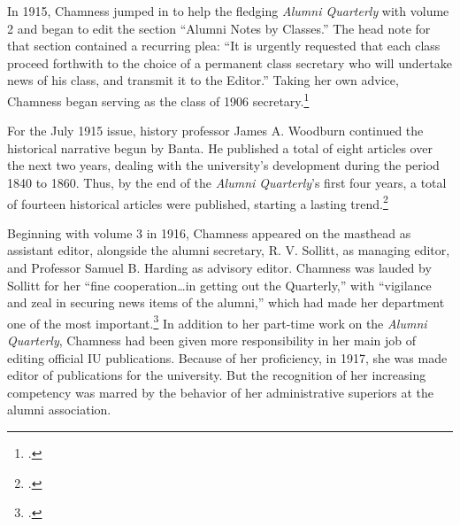 \documentclass[
  american,
  letterpaper,
]{scrreprt}
\begin{document}
In 1915, Chamness jumped in to help the fledging \emph{Alumni Quarterly}
with volume 2 and began to edit the section ``Alumni Notes by Classes.''
The head note for that section contained a recurring plea: ``It is
urgently requested that each class proceed forthwith to the choice of a
permanent class secretary who will undertake news of his class, and
transmit it to the Editor.'' Taking her own advice, Chamness began
serving as the class of 1906 secretary.\footnote{.}

For the July 1915 issue, history professor James A. Woodburn continued
the historical narrative begun by Banta. He published a total of eight
articles over the next two years, dealing with the university's
development during the period 1840 to 1860. Thus, by the end of the
\emph{Alumni Quarterly}'s first four years, a total of fourteen
historical articles were published, starting a lasting trend.\footnote{.}

Beginning with volume 3 in 1916, Chamness appeared on the masthead as
assistant editor, alongside the alumni secretary, R. V. Sollitt, as
managing editor, and Professor Samuel B. Harding as advisory editor.
Chamness was lauded by Sollitt for her ``fine cooperation\ldots in
getting out the Quarterly,'' with ``vigilance and zeal in securing news
items of the alumni,'' which had made her department one of the most
important.\footnote{.} In addition to her part-time work on the \emph{Alumni
Quarterly}, Chamness had been given more responsibility in her main job
of editing official IU publications. Because of her proficiency, in
1917, she was made editor of publications for the university. But the
recognition of her increasing competency was marred by the behavior of
her administrative superiors at the alumni association.
\end{document}
